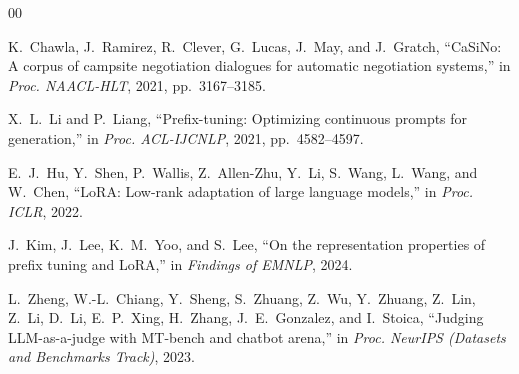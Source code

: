 \documentclass[conference]{IEEEtran}
\begin{document}
\begin{thebibliography}{00}

K.~Chawla, J.~Ramirez, R.~Clever, G.~Lucas, J.~May, and J.~Gratch,
``CaSiNo: A corpus of campsite negotiation dialogues for automatic negotiation systems,''
in \textit{Proc. NAACL-HLT}, 2021, pp.~3167--3185.

X.~L.~Li and P.~Liang,
``Prefix-tuning: Optimizing continuous prompts for generation,''
in \textit{Proc. ACL-IJCNLP}, 2021, pp.~4582--4597.

E.~J.~Hu, Y.~Shen, P.~Wallis, Z.~Allen-Zhu, Y.~Li, S.~Wang, L.~Wang, and W.~Chen,
``LoRA: Low-rank adaptation of large language models,''
in \textit{Proc. ICLR}, 2022.

J.~Kim, J.~Lee, K.~M.~Yoo, and S.~Lee,
``On the representation properties of prefix tuning and LoRA,''
in \textit{Findings of EMNLP}, 2024.

L.~Zheng, W.-L.~Chiang, Y.~Sheng, S.~Zhuang, Z.~Wu, Y.~Zhuang, Z.~Lin, Z.~Li, D.~Li, E.~P.~Xing, H.~Zhang, J.~E.~Gonzalez, and I.~Stoica,
``Judging LLM-as-a-judge with MT-bench and chatbot arena,''
in \textit{Proc. NeurIPS (Datasets and Benchmarks Track)}, 2023.

\end{thebibliography}
\end{document}
